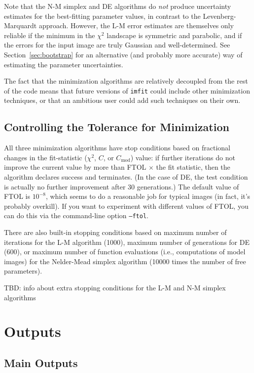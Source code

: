 \documentclass[10pt,a4paper,article]{memoir}
\newcommand{\imfit}{\texttt{imfit}}
\newcommand{\chisquare}{\ensuremath{\chi^{2}}}
\begin{document}
Note that the N-M simplex and DE algorithms do \textit{not} produce uncertainty
estimates for the best-fitting parameter values, in contrast to the
Levenberg-Marquardt approach. However, the L-M error estimates are themselves
only reliable if the minimum in the \chisquare{} landscape is symmetric and
parabolic, and if the errors for the input image are truly Gaussian and
well-determined.  See Section~\ref{sec:bootstrap} for an alternative (and probably
more accurate) way of estimating the parameter uncertainties.

\medskip

The fact that the minimization algorithms are relatively decoupled from the rest
of the code means that future versions of \imfit{} could include
other minimization techniques, or that an ambitious user could add such techniques
on their own.


\section{Controlling the Tolerance for Minimization}

All three minimization algorithms have stop conditions based on
fractional changes in the fit-statistic (\chisquare{}, $C$, or $C_{\mathrm{mod}}$)
value: if further iterations do not improve the current value by more
than FTOL $\times$ the fit statistic, then the algorithm declares success and
terminates. (In the case of DE, the test condition is actually no
further improvement after 30 generations.) The default value of FTOL is
$10^{-8}$, which seems to do a reasonable job for typical images (in
fact, it's probably overkill). If you want to experiment with different
values of FTOL, you can do this via the command-line option
\texttt{--ftol}.

There are also built-in stopping conditions based on maximum number of
iterations for the L-M algorithm (1000), maximum number of generations for DE
(600), or maximum number of function evaluations (i.e., computations of model
images) for the Nelder-Mead simplex algorithm (10000 times the number of free
parameters).

TBD: info about extra stopping conditions for the L-M and N-M simplex algorithms




\chapter{Outputs}

\section{Main Outputs}
\end{document}
